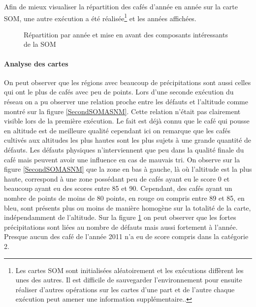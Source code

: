 \noindent Afin de mieux visualiser la répartition des cafés d'année en année sur la carte SOM, une autre exécution a été réalisée\footnote{Les cartes SOM sont initialisées aléatoirement et les exécutions diffèrent les unes des autres. Il est difficile de sauvegarder l'environnement pour ensuite réaliser d'autres opérations sur les cartes d'une part et de l'autre chaque exécution peut amener une information supplémentaire..} et les années affichées. 


\begin{figure}[H]
	\caption{\label{ThirdSOMASNM}Répartition par année et mise en avant des composants intéressants de la SOM}
	\centering
	\hfill
	\newline
	
	\centering
	\hfill
	\hfill
	\newline
	\centering 
\end{figure}

\newpage
\paragraph{Analyse des cartes}On peut observer que les régions avec beaucoup de précipitations sont aussi celles qui ont le plus de cafés avec peu de points. Lors d'une seconde exécution du réseau on a pu observer une relation proche entre les défauts et l'altitude comme montré sur la figure \ref{SecondSOMASNM}. Cette relation n'était pas clairement visible lors de la première exécution. Le fait est déjà connu que le café qui pousse en altitude est de meilleure qualité cependant ici on remarque que les cafés cultivés aux altitudes les plus hautes sont les plus sujets à une grande quantité de défauts. Les défauts physiques n'interviennent que peu dans la qualité finale du café mais peuvent avoir une influence en cas de mauvais tri. On observe sur la figure \ref{SecondSOMASNM} que la zone en bas à gauche, là où l'altitude est la plus haute, correspond à une zone possédant peu de cafés ayant eu le score 0 et beaucoup ayant eu des scores entre 85 et 90. Cependant, des cafés ayant un nombre de points de moins de 80 points, en rouge ou compris entre 89 et 85, en bleu, sont présents plus ou moins de manière homogène sur la totalité de la carte, indépendamment de l'altitude. Sur la figure \ref{ThirdSOMASNM} on peut observer que les fortes précipitations sont liées au nombre de défauts mais aussi fortement à l'année. Presque aucun des café de l'année 2011 n'a eu de score compris dans la catégorie 2. 


